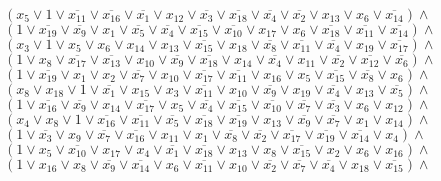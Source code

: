 \documentclass[a4paper,12pt]{article} %
\begin{document}
$(x_{5}\lor 1\lor \overline{x_{11}}\lor \overline{x_{16}}\lor \overline{x_{1}}\lor x_{12}\lor \overline{x_{3}}\lor \overline{x_{18}}\lor \overline{x_{4}}\lor \overline{x_{2}}\lor x_{13}\lor x_{6}\lor \overline{x_{14}})\land$\\
$(1\lor \overline{x_{19}}\lor \overline{x_{9}}\lor x_{1}\lor \overline{x_{5}}\lor \overline{x_{4}}\lor \overline{x_{15}}\lor \overline{x_{10}}\lor x_{17}\lor x_{6}\lor \overline{x_{18}}\lor \overline{x_{11}}\lor \overline{x_{14}})\land$\\
$(x_{3}\lor 1\lor x_{5}\lor x_{6}\lor x_{14}\lor x_{13}\lor \overline{x_{15}}\lor x_{18}\lor \overline{x_{8}}\lor \overline{x_{11}}\lor \overline{x_{4}}\lor x_{19}\lor \overline{x_{17}})\land$\\
$(1\lor x_{8}\lor \overline{x_{17}}\lor \overline{x_{13}}\lor x_{10}\lor \overline{x_{9}}\lor \overline{x_{18}}\lor x_{14}\lor \overline{x_{4}}\lor x_{11}\lor \overline{x_{2}}\lor \overline{x_{12}}\lor \overline{x_{6}})\land$\\
$(1\lor \overline{x_{19}}\lor x_{1}\lor x_{2}\lor \overline{x_{7}}\lor x_{10}\lor \overline{x_{17}}\lor \overline{x_{11}}\lor x_{16}\lor x_{5}\lor \overline{x_{15}}\lor \overline{x_{8}}\lor x_{6})\land$\\
$(x_{8}\lor x_{18}\lor 1\lor \overline{x_{1}}\lor x_{15}\lor x_{3}\lor \overline{x_{11}}\lor x_{10}\lor \overline{x_{9}}\lor x_{19}\lor \overline{x_{4}}\lor x_{13}\lor \overline{x_{5}})\land$\\
$(1\lor \overline{x_{16}}\lor \overline{x_{9}}\lor x_{14}\lor \overline{x_{17}}\lor x_{5}\lor \overline{x_{4}}\lor \overline{x_{15}}\lor \overline{x_{10}}\lor \overline{x_{7}}\lor \overline{x_{3}}\lor x_{6}\lor x_{12})\land$\\
$(x_{4}\lor x_{8}\lor 1\lor \overline{x_{16}}\lor \overline{x_{11}}\lor \overline{x_{5}}\lor \overline{x_{18}}\lor \overline{x_{19}}\lor x_{13}\lor \overline{x_{9}}\lor \overline{x_{7}}\lor x_{1}\lor x_{14})\land$\\
$(1\lor \overline{x_{3}}\lor x_{9}\lor \overline{x_{7}}\lor \overline{x_{16}}\lor x_{11}\lor x_{1}\lor \overline{x_{8}}\lor \overline{x_{2}}\lor \overline{x_{17}}\lor \overline{x_{19}}\lor \overline{x_{14}}\lor x_{4})\land$\\
$(1\lor x_{5}\lor \overline{x_{10}}\lor x_{17}\lor x_{4}\lor \overline{x_{1}}\lor \overline{x_{18}}\lor x_{13}\lor x_{8}\lor \overline{x_{15}}\lor x_{2}\lor x_{6}\lor x_{16})\land$\\
$(1\lor x_{16}\lor x_{8}\lor \overline{x_{9}}\lor \overline{x_{14}}\lor x_{6}\lor \overline{x_{11}}\lor x_{10}\lor \overline{x_{2}}\lor \overline{x_{7}}\lor \overline{x_{4}}\lor x_{18}\lor \overline{x_{15}})\land$\\
\end{document}
